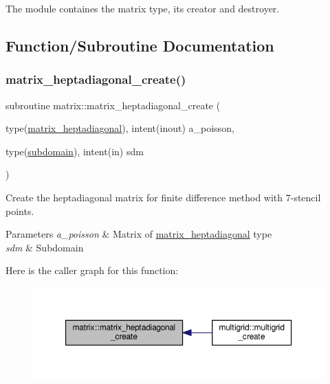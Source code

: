The module containes the matrix type, its creator and destroyer. 

\subsection{Function/\+Subroutine Documentation}
\mbox{\label{namespacematrix_af96fcc5a5c79a720967847d6569ce479}} 
\subsubsection{\texorpdfstring{matrix\+\_\+heptadiagonal\+\_\+create()}{matrix\_heptadiagonal\_create()}}
{\footnotesize\ttfamily subroutine matrix\+::matrix\+\_\+heptadiagonal\+\_\+create (\begin{DoxyParamCaption}\item[{type(\hyperlink{structmatrix_1_1matrix__heptadiagonal}{matrix\+\_\+heptadiagonal}), intent(inout)}]{a\+\_\+poisson,  }\item[{type(\hyperlink{structgeometry_1_1subdomain}{subdomain}), intent(in)}]{sdm }\end{DoxyParamCaption})}



Create the heptadiagonal matrix for finite difference method with 7-\/stencil points. 


\begin{DoxyParams}{Parameters}
{\em a\+\_\+poisson} & Matrix of \hyperlink{structmatrix_1_1matrix__heptadiagonal}{matrix\+\_\+heptadiagonal} type \\
\hline
{\em sdm} & Subdomain \\
\hline
\end{DoxyParams}
Here is the caller graph for this function\+:
\nopagebreak
\begin{figure}[H]
\begin{center}
\leavevmode
\includegraphics[width=350pt]{namespacematrix_af96fcc5a5c79a720967847d6569ce479_icgraph}
\end{center}
\end{figure}
\mbox{\label{namespacematrix_a1c201958a669deaddeb6aa76251b394f}} 
